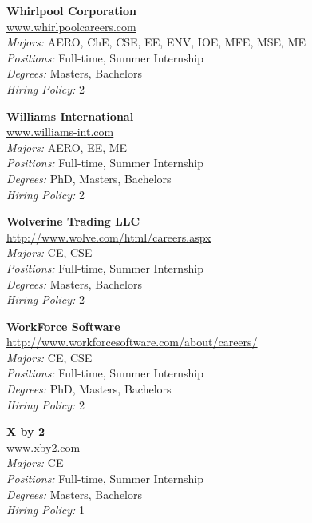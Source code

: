 \documentclass{article}
\begin{document}
\begin{center}
\begin{multicols}{3}
\begin{minipage}{.9\columnwidth}{\Large\bf Whirlpool Corporation }\\
	\url{www.whirlpoolcareers.com}\\
	\emph{Majors:} AERO, ChE, CSE, EE, ENV, IOE, MFE, MSE, ME\\
	\emph{Positions:} Full-time, Summer Internship\\
	\emph{Degrees:} Masters, Bachelors\\
	\emph{Hiring Policy:} 2\\
\end{minipage}
 
\begin{minipage}{.9\columnwidth}{\Large\bf Williams International }\\
	\url{www.williams-int.com}\\
	\emph{Majors:} AERO, EE, ME\\
	\emph{Positions:} Full-time, Summer Internship\\
	\emph{Degrees:} PhD, Masters, Bachelors\\
	\emph{Hiring Policy:} 2\\
\end{minipage}
 
\begin{minipage}{.9\columnwidth}{\Large\bf Wolverine Trading LLC }\\
	\url{http://www.wolve.com/html/careers.aspx}\\
	\emph{Majors:} CE, CSE\\
	\emph{Positions:} Full-time, Summer Internship\\
	\emph{Degrees:} Masters, Bachelors\\
	\emph{Hiring Policy:} 2\\
\end{minipage}
 
\begin{minipage}{.9\columnwidth}{\Large\bf WorkForce Software }\\
	\url{http://www.workforcesoftware.com/about/careers/}\\
	\emph{Majors:} CE, CSE\\
	\emph{Positions:} Full-time, Summer Internship\\
	\emph{Degrees:} PhD, Masters, Bachelors\\
	\emph{Hiring Policy:} 2\\
\end{minipage}
 
\begin{minipage}{.9\columnwidth}{\Large\bf X by 2 }\\
	\url{www.xby2.com}\\
	\emph{Majors:} CE\\
	\emph{Positions:} Full-time, Summer Internship\\
	\emph{Degrees:} Masters, Bachelors\\
	\emph{Hiring Policy:} 1\\
\end{minipage}
 

\end{multicols}
\end{center}
\end{document}
